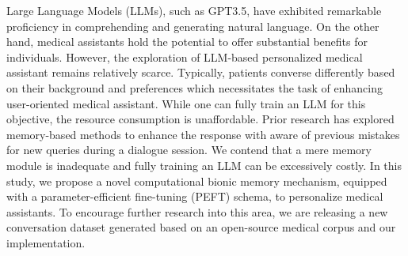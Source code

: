 Large Language Models (LLMs), such as GPT3.5, have exhibited remarkable proficiency in comprehending and generating natural language. On the other hand, medical assistants hold the potential to offer substantial benefits for individuals. However, the exploration of LLM-based personalized medical assistant remains relatively scarce.  Typically, patients converse differently based on their background and preferences which necessitates the task of enhancing user-oriented medical assistant. While one can fully train an LLM for this objective, the resource consumption is unaffordable. Prior research has explored memory-based methods to enhance the response with aware of previous mistakes for new queries during a dialogue session. We contend that a mere memory module is inadequate and fully training an LLM can be excessively costly. In this study, we propose a novel computational bionic memory mechanism, equipped with a parameter-efficient fine-tuning (PEFT) schema, to personalize medical assistants. To encourage further research into this area, we are releasing a new conversation dataset generated based on an open-source medical corpus and our implementation.